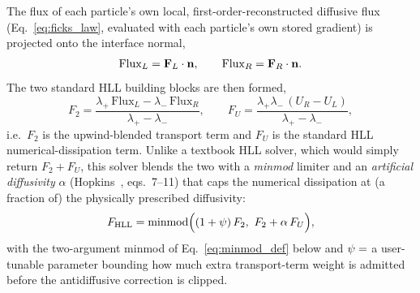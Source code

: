 The flux of each particle's own local, first-order-reconstructed
diffusive flux (Eq.~\eqref{eq:ficks_law}, evaluated with each particle's
own stored gradient) is projected onto the interface normal,
\begin{equation}
  \mathrm{Flux}_{L} = \mathbf{F}_L\cdot\mathbf{n} , \qquad \mathrm{Flux}_R = \mathbf{F}_R\cdot\mathbf{n} .
\end{equation}
The two standard HLL building blocks are then formed,
\begin{equation}
  F_2 = \frac{\lambda_+\,\mathrm{Flux}_L - \lambda_-\,\mathrm{Flux}_R}{\lambda_+-\lambda_-} ,
  \qquad
  F_U = \frac{\lambda_+\lambda_- \,(U_R-U_L)}{\lambda_+-\lambda_-} ,
\end{equation}
i.e.\ $F_2$ is the upwind-blended transport term and $F_U$ is the
standard HLL numerical-dissipation term. Unlike a textbook HLL solver,
which would simply return $F_2 + F_U$, this solver blends the two with a
\emph{minmod} limiter and an \emph{artificial diffusivity} $\alpha$
(Hopkins~\citeyear{Hopkins2017diffusion}, eqs.~7--11) that caps the numerical dissipation at (a
fraction of) the physically prescribed diffusivity:
\begin{equation}
  \label{eq:flux_hll}
  F_{\rm HLL} = \mathrm{minmod}\Big((1+\psi)\, F_2,\ F_2 + \alpha\, F_U\Big) ,
\end{equation}
with the two-argument minmod of Eq.~\eqref{eq:minmod_def} below and
$\psi = $  a user-tunable
parameter bounding how much extra transport-term weight is admitted
before the antidiffusive correction is clipped.

